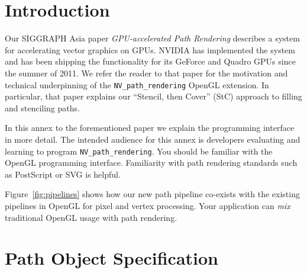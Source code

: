 
\section{Introduction}
\label{sec:api}

Our SIGGRAPH Asia paper {\em GPU-accelerated Path Rendering} \cite{KilgardBolz2012}
describes a system for accelerating vector graphics on GPUs. NVIDIA has
implemented the system and has been shipping the functionality for its GeForce and Quadro GPUs since the summer of 2011.
We refer the reader to that paper for the motivation and technical underpinning
of the {\tt NV\_path\_rendering} \cite{NVpr} OpenGL extension.  In particular, that
paper explains our ``Stencil, then Cover'' (StC) approach to filling and stenciling paths.

In this annex to the forementioned paper we explain the programming interface in
more detail.  The intended audience for this annex is developers
evaluating and learning to program {\tt NV\_path\_rendering}.  You should
be familiar with the OpenGL \cite{OpenGLspec} programming interface.
Familiarity with path rendering standards such as PostScript or SVG is helpful.

Figure~\ref{fig:pipelines} shows how our new path pipeline co-exists
with the existing pipelines in OpenGL for pixel and vertex processing.
Your application can {\em mix} traditional OpenGL usage with path rendering.

\section{Path Object Specification}

